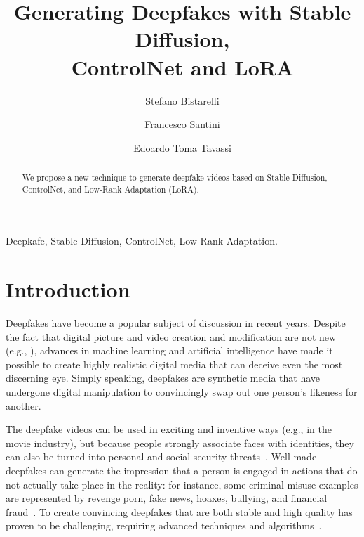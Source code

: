 \documentclass[preprint]{elsarticle}
\begin{document}
\begin{frontmatter}


\title{Generating Deepfakes with Stable Diffusion,\\ ControlNet and LoRA}





\author[perugia]{Stefano Bistarelli}
\author[perugia]{Francesco Santini}
\author[perugia]{Edoardo Toma Tavassi}


\address[perugia]{Dipartimento di Matematica e  Informatica, University of Perugia, Italy}




\begin{abstract} 
We propose a new technique to generate deepfake videos based on Stable Diffusion, ControlNet, and Low-Rank Adaptation (LoRA).
\end{abstract}

\begin{keyword}
Deepkafe, Stable Diffusion, ControlNet, Low-Rank Adaptation.
\end{keyword}
\end{frontmatter}



\section{Introduction}\label{sec:intro}
Deepfakes have become a popular subject of discussion in recent years. 
Despite the fact that digital picture and video creation and modification are not new (e.g., \cite{farid}), advances in machine learning and artificial intelligence have made it possible to create highly realistic digital media that can deceive even the most discerning eye. Simply speaking, deepfakes are synthetic media that have undergone digital manipulation to convincingly swap out one person's likeness for another.

The deepfake videos can be used in exciting and inventive ways (e.g., in the movie industry), but because people strongly associate faces with  identities, they can also be turned into personal and social security-threats~\cite{securitythreat}. Well-made deepfakes  can generate the impression that a person is  engaged in actions that do not actually take place in the reality: for instance, some criminal misuse examples are represented by revenge porn, fake news, hoaxes, bullying, and financial fraud~\cite{financialfraud}.
To create convincing deepfakes that are both stable and high quality has proven  to be challenging, requiring advanced techniques and algorithms~\cite{survey2}. 
\end{document}
